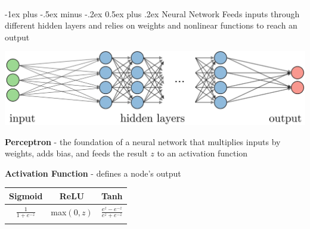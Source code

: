 \documentclass[10pt,landscape]{article}
\makeatletter
\renewcommand{\section}{\@startsection{section}{1}{0mm}%
                                {-1ex plus -.5ex minus -.2ex}%
                                {0.5ex plus .2ex}%
                                {\normalfont\large\bfseries}}
\makeatother
\begin{document}
\begin{multicols}{3}
    \textcolor{white}{.}\vspace{-5mm}\\ %
    \section{Neural Network}
    Feeds inputs through different hidden layers and relies on weights and nonlinear functions to reach an output
    \vspace{-1mm}
    \begin{center}
        \includegraphics[scale = .11]{images/nn3.JPG}
    \end{center}
    \vspace{-1mm}
    \textbf{Perceptron} - the foundation of a neural network that multiplies inputs by weights, adds bias, and feeds the result $z$ to an activation function

    \textbf{Activation Function} - defines a node's output

    \vspace{-1mm}
    \begin{center}
        \begin{tabular}{c|c|c}
            Sigmoid                                             & ReLU       & Tanh                                \\
            \hline
            \rule{0pt}{3ex}
            $\frac{1}{1+e^{-z}} $                               & max$(0,z)$ & $\frac{e^z - e^{-z}}{e^z + e^{-z}}$ \\
                                                                &            & \vspace{-2mm}                       \\


\end{tabular}
\end{center}
\end{multicols}
\end{document}
